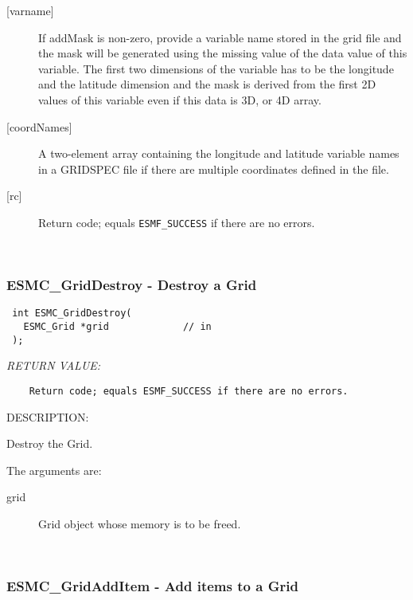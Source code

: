 \begin{description}
   \item[{[varname]}]
        If addMask is non-zero, provide a variable name stored in the grid file and
        the mask will be generated using the missing value of the data value of
        this variable.  The first two dimensions of the variable has to be the
        longitude and the latitude dimension and the mask is derived from the
        first 2D values of this variable even if this data is 3D, or 4D array.
  \item[{[coordNames]}]
        A two-element array containing the longitude and latitude variable names in a
        GRIDSPEC file if there are multiple coordinates defined in the file.
   \item[{[rc]}]
        Return code; equals {\tt ESMF\_SUCCESS} if there are no errors.
    \end{description}
   
 
\mbox{}\hrulefill\ 
 
\subsubsection [ESMC\_GridDestroy] {ESMC\_GridDestroy - Destroy a Grid}


  
\begin{verbatim} int ESMC_GridDestroy(
   ESMC_Grid *grid             // in
 );
 \end{verbatim}{\em RETURN VALUE:}
\begin{verbatim}    Return code; equals ESMF_SUCCESS if there are no errors.\end{verbatim}
{\sf DESCRIPTION:\\ }


    Destroy the Grid.
  
    The arguments are:
    \begin{description}
    \item[grid]
      Grid object whose memory is to be freed. 
    \end{description}
   
 
\mbox{}\hrulefill\ 
 
\subsubsection [ESMC\_GridAddItem] {ESMC\_GridAddItem - Add items to a Grid}


